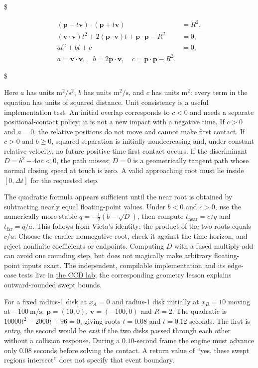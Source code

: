 \$

\[\begin{aligned}
(\mathbf p+t\mathbf v)\cdot(\mathbf p+t\mathbf v)&=R^2,\\
(\mathbf v\cdot\mathbf v)t^2+2(\mathbf p\cdot\mathbf v)t
+\mathbf p\cdot\mathbf p-R^2&=0,\\
at^2+bt+c&=0,\\
a=\mathbf v\cdot\mathbf v,\quad
b=2\mathbf p\cdot\mathbf v,\quad
c=\mathbf p\cdot\mathbf p-R^2.&
\end{aligned}\]

\$

Here \(a\) has units \(\mathrm{m}^2/\mathrm{s}^2\), \(b\) has units \(\mathrm{m}^2/\mathrm{s}\), and \(c\) has units \(\mathrm{m}^2\): every term in the equation has units of squared distance. Unit consistency is a useful implementation test. An initial overlap corresponds to \(c<0\) and needs a separate positional-contact policy; it is not a new impact with a negative time. If \(c>0\) and \(a=0\), the relative positions do not move and cannot make first contact. If \(c>0\) and \(b\ge0\), squared separation is initially nondecreasing and, under constant relative velocity, no future positive-time first contact occurs. If the discriminant \(D=b^2-4ac<0\), the path misses; \(D=0\) is a geometrically tangent path whose normal closing speed at touch is zero. A valid approaching root must lie inside \([0,\Delta t]\) for the requested step.

The quadratic formula appears sufficient until the near root is obtained by subtracting nearly equal floating-point values. Under \(b<0\) and \(c>0\), use the numerically more stable \(q=-\tfrac12(b-\sqrt D)\), then compute \(t_{\mathrm{near}}=c/q\) and \(t_{\mathrm{far}}=q/a\). This follows from Vieta's identity: the product of the two roots equals \(c/a\). Choose the earlier nonnegative root, check it against the time horizon, and reject nonfinite coefficients or endpoints. Computing \(D\) with a fused multiply-add can avoid one rounding step, but does not magically make arbitrary floating-point inputs exact. The independent, compilable implementation and its edge-case tests live in \hyperref[source-file-887bbb1db2a031cbbf1eee43]{the CCD lab}; the corresponding geometry lesson explains outward-rounded swept bounds.

For a fixed radius-1 disk at \(x_A=0\) and radius-1 disk initially at \(x_B=10\) moving at \(-100\ \mathrm{m/s}\), \(\mathbf p=(10,0)\), \(\mathbf v=(-100,0)\) and \(R=2\). The quadratic is \(10000t^2-2000t+96=0\), giving roots \(t=0.08\) and \(t=0.12\) seconds. The first is \emph{entry}, the second would be \emph{exit} if the two disks passed through each other without a collision response. During a \(0.10\)-second frame the engine must advance only \(0.08\) seconds before solving the contact. A return value of ``yes, these swept regions intersect'' does not specify that event boundary.

